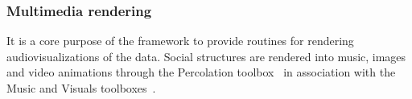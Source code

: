 																																																																																																																																																																																																																																																																																																																																																																																																																																																								\subsubsection{Multimedia rendering}\label{media}
																																																																																																																																																																																																																																																																																																																																																																																																																																																								It is a core purpose of the framework to provide routines for rendering
																																																																																																																																																																																																																																																																																																																																																																																																																																																								audiovisualizations of the data.
																																																																																																																																																																																																																																																																																																																																																																																																																																																								Social structures are rendered into music, images and video animations
																																																																																																																																																																																																																																																																																																																																																																																																																																																								through the Percolation toolbox~\cite{percolation} in association with
																																																																																																																																																																																																																																																																																																																																																																																																																																																								the Music and Visuals toolboxes~\cite{music,visuals}.

